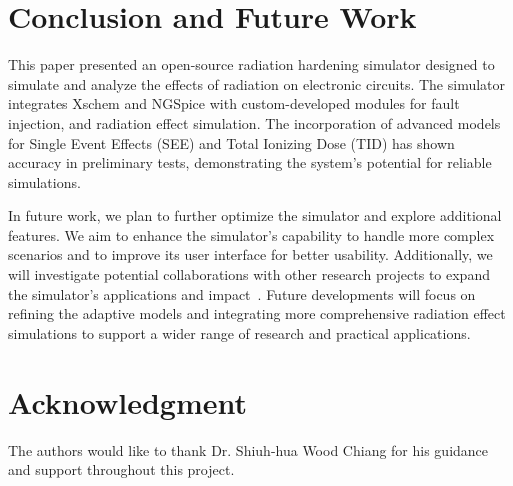 \documentclass[conference]{IEEEtran}
\begin{document}
    \section{Conclusion and Future Work}\label{sec:conclusion-and-future-work}
    This paper presented an open-source radiation hardening simulator designed to simulate and analyze the effects of radiation on electronic circuits.
    The simulator integrates Xschem and NGSpice with custom-developed modules for fault injection, and radiation effect simulation.
    The incorporation of advanced models for Single Event Effects (SEE) and Total Ionizing Dose (TID) has shown accuracy in preliminary tests, demonstrating the system's potential for reliable simulations.

    In future work, we plan to further optimize the simulator and explore additional features.
    We aim to enhance the simulator's capability to handle more complex scenarios and to improve its user interface for better usability.
    Additionally, we will investigate potential collaborations with other research projects to expand the simulator's applications and impact~\cite{Pepper1990}.
    Future developments will focus on refining the adaptive models and integrating more comprehensive radiation effect simulations to support a wider range of research and practical applications.

    \section*{Acknowledgment}
    The authors would like to thank Dr. Shiuh-hua Wood Chiang for his guidance and support throughout this project.

    
    
\end{document}
